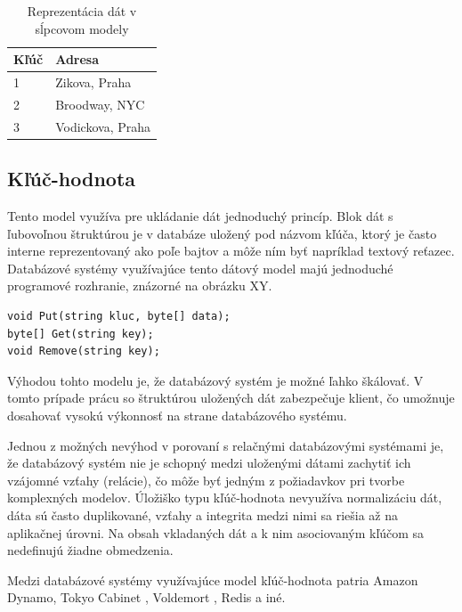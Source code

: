\documentclass[11pt,twoside,a4paper]{book}
\begin{document}
\begin{table}[hp]
\begin{center}
    \begin{tabular}{l|l}

  Kľúč &  Adresa\\ \hline

  1&Zikova, Praha  \\
  2&Broodway, NYC\\
  3&Vodickova, Praha \\

    \end{tabular}
\end{center}
\caption{Reprezentácia dát v sĺpcovom modely}
\label{tab:Nosql}
\end{table}

\subsection{Kľúč-hodnota}


Tento model využíva pre ukládanie dát jednoduchý princíp. Blok dát s ľubovoľnou štruktúrou je v databáze uložený pod názvom kľúča, ktorý je často interne reprezentovaný ako poľe bajtov a môže ním byť napríklad textový reťazec. Databázové systémy využívajúce tento dátový model majú jednoduché programové rozhranie, znázorné na obrázku XY.

\begin{verbatim}
void Put(string kluc, byte[] data);
byte[] Get(string key);
void Remove(string key);
\end{verbatim}


Výhodou tohto modelu je, že databázový systém je možné ľahko škálovať. V tomto prípade prácu so štruktúrou uložených dát zabezpečuje klient, čo umožnuje dosahovať vysokú výkonnosť na strane databázového systému.

Jednou z možných nevýhod v porovaní s relačnými databázovými systémami je, že databázový systém nie je schopný medzi uloženými dátami zachytiť ich vzájomné vzťahy (relácie), čo môže byť jedným z požiadavkov pri tvorbe komplexných modelov. Úložiško typu kľúč-hodnota nevyužíva normalizáciu dát, dáta sú často duplikované, vzťahy a integrita medzi nimi sa riešia až na aplikačnej úrovni. Na obsah vkladaných dát a k nim asociovaným kľúčom sa nedefinujú žiadne obmedzenia.

Medzi databázové systémy využívajúce model kľúč-hodnota patria Amazon Dynamo, Tokyo Cabinet \cite{TODO}, Voldemort \cite{TODO}, Redis \cite{TODO} a iné.
\end{document}
